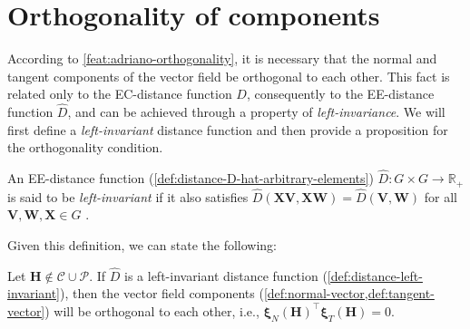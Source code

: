 \section{Orthogonality of components}
According to \cref{feat:adriano-orthogonality}, it is necessary that the normal and tangent components of the vector field be orthogonal to each other. This fact is related only to the EC-distance function $D$, consequently to the EE-distance function $\widehat{D}$, and can be achieved through a property of \emph{left-invariance}. We will first define a \emph{left-invariant} distance function and then provide a proposition for the orthogonality condition.
\begin{definition}\label{def:distance-left-invariant}
    An EE-distance function (\cref{def:distance-D-hat-arbitrary-elements}) $\widehat{D}:G\times G\to\mathbb{R}_+$ is said to be  \emph{left-invariant} if it also satisfies $\widehat{D}(\mathbf{X}\mathbf{V}, \mathbf{X}\mathbf{W}) = \widehat{D}(\mathbf{V}, \mathbf{W})$ for all $\mathbf{V}, \mathbf{W}, \mathbf{X} \in G$ .
\end{definition}
Given this definition, we can state the following:
\begin{proposition}\label{propos:left-invariant-metric-induces-orthogonal}
    Let $\mathbf{H} \not \in \mathcal{C} \cup \mathcal{P}$. If $\widehat{D}$ is a left-invariant distance function (\cref{def:distance-left-invariant}), then the vector field components (\cref{def:normal-vector,def:tangent-vector}) will be orthogonal to each other, i.e., $\boldsymbol{\xi}_N(\mathbf{H})^{\top}\boldsymbol{\xi}_T(\mathbf{H})=0$.
\end{proposition}
